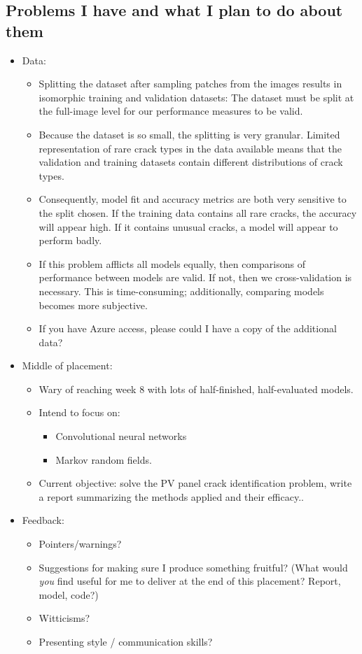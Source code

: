 \documentclass[11pt]{article} %
\begin{document}
\subsection*{Problems I have and what I plan to do about them}
\begin{itemize}
	\item Data:
	\begin{itemize}
		\item Splitting the dataset after sampling patches from the images results in isomorphic training and validation datasets: The dataset must be split at the full-image level for our performance measures to be valid.
		\item Because the dataset is so small, the splitting is very granular. Limited representation of rare crack types in the data available means that the validation and training datasets contain different distributions of crack types.
		\item Consequently,  model fit and accuracy metrics are both very sensitive to the split chosen. If the training data contains all rare cracks, the accuracy will appear high. If it contains unusual cracks, a model will appear to perform badly.
		\item If this problem afflicts all models equally, then comparisons of performance between models are valid. If not, then we cross-validation is necessary. This is time-consuming; additionally, comparing models becomes more subjective.
		\item If you have Azure access, please could I have a copy of the additional data?
	\end{itemize}
	\item Middle of placement:
	\begin{itemize}
		\item Wary of reaching week 8 with lots of half-finished, half-evaluated models.
		\item Intend to focus on:
		\begin{itemize}
			\item Convolutional neural networks
			\item Markov random fields.
		\end{itemize}
		\item Current objective: solve the PV panel crack identification problem, write a report summarizing the methods applied and their efficacy..
	\end{itemize}
	\item Feedback:
	\begin{itemize}
		\item Pointers/warnings?
		\item Suggestions for making sure I produce something fruitful? (What would \emph{you} find useful for me to deliver at the end of this placement? Report, model, code?)
		\item Witticisms?
		\item Presenting style / communication skills?
	\end{itemize}
\end{itemize}
\end{document}
